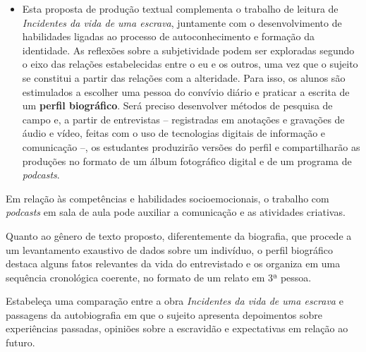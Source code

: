 \documentclass[12pt]{extarticle}
\begin{document}
\begin{itemize}
\item
  Esta proposta de produção textual complementa o trabalho de leitura de
  \emph{Incidentes da vida de uma escrava}, juntamente com o
  desenvolvimento de habilidades ligadas ao processo de autoconhecimento
  e formação da identidade. As reflexões sobre a subjetividade podem ser
  exploradas segundo o eixo das relações estabelecidas entre o eu e os
  outros, uma vez que o sujeito se constitui a partir das relações com a
  alteridade. Para isso, os alunos são estimulados a escolher uma pessoa
  do convívio diário e praticar a escrita de um \textbf{perfil
  biográfico}. Será preciso desenvolver métodos de pesquisa de campo e,
  a partir de entrevistas -- registradas em anotações e gravações de
  áudio e vídeo, feitas com o uso de tecnologias digitais de informação
  e comunicação --, os estudantes produzirão versões do perfil e
  compartilharão as produções no formato de um álbum fotográfico digital
  e de um programa de \emph{podcasts}.
\end{itemize}

Em relação às competências e habilidades socioemocionais, o trabalho com
\emph{podcasts} em sala de aula pode auxiliar a comunicação e as
atividades criativas.

Quanto ao gênero de texto proposto, diferentemente da biografia, que
procede a um levantamento exaustivo de dados sobre um indivíduo, o
perfil biográfico destaca alguns fatos relevantes da vida do
entrevistado e os organiza em uma sequência cronológica coerente, no
formato de um relato em 3ª pessoa.

Estabeleça uma comparação entre a obra \emph{Incidentes da vida de uma
escrava} e passagens da autobiografia em que o sujeito apresenta
depoimentos sobre experiências passadas, opiniões sobre a escravidão e
expectativas em relação ao futuro.
\end{document}
